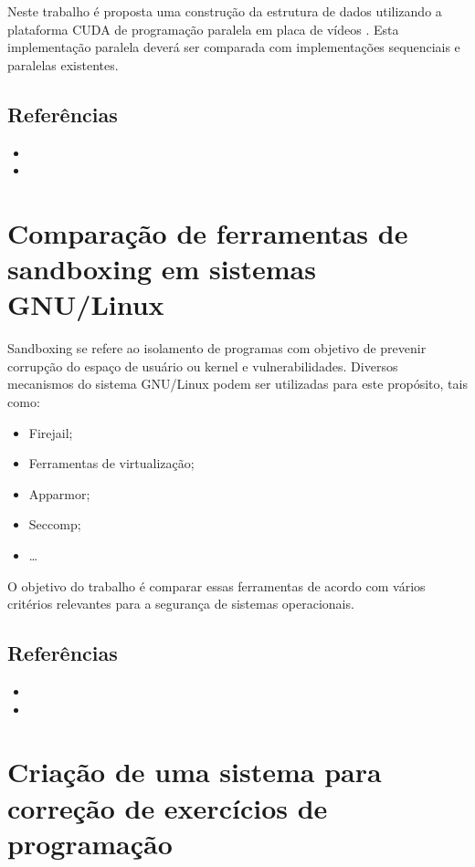 \documentclass{article}
\begin{document}
Neste trabalho é proposta uma construção da estrutura de dados utilizando a plataforma CUDA de programação paralela em placa de vídeos . Esta implementação paralela deverá ser comparada com implementações sequenciais e paralelas existentes.

\subsection*{Referências}

\begin{itemize}
	\item {}
	\item {}
\end{itemize}

\section*{Comparação de ferramentas de sandboxing em sistemas GNU/Linux}

Sandboxing se refere ao isolamento de programas com objetivo de prevenir corrupção do espaço de usuário ou kernel e vulnerabilidades. Diversos mecanismos do sistema GNU/Linux podem ser utilizadas para este propósito, tais como: 
\begin{itemize}
	\item Firejail;
	\item Ferramentas de virtualização;
	\item Apparmor;
	\item Seccomp;
	\item \ldots
\end{itemize}



O objetivo do trabalho é comparar essas ferramentas de acordo com vários critérios relevantes para a segurança de sistemas operacionais.

\subsection*{Referências}

\begin{itemize}
	\item {}
	\item {}
\end{itemize}

\section*{Criação de uma sistema para correção de exercícios de programação}
\end{document}
